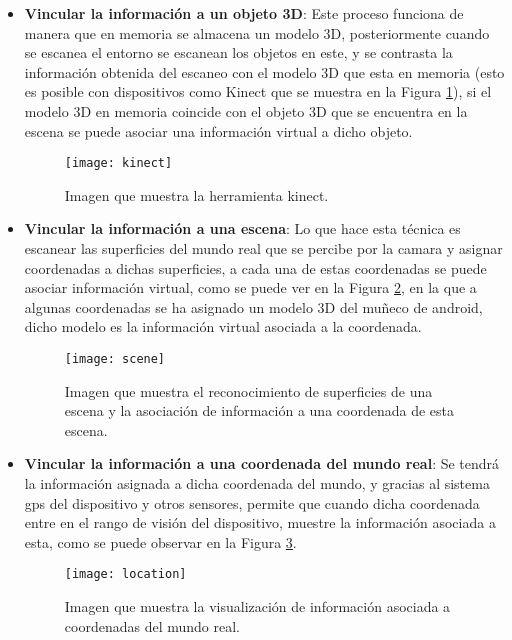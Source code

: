 \begin{itemize}
  \item \textbf{Vincular la información a un objeto 3D}: Este proceso funciona de manera que en memoria se almacena un modelo 3D, posteriormente cuando se escanea el entorno se escanean los objetos en este, y se contrasta la información obtenida del escaneo con el modelo 3D que esta en memoria (esto es posible con dispositivos como Kinect que se muestra en la Figura \ref{figura-kinect}), si el modelo 3D en memoria coincide con el objeto 3D que se encuentra en la escena se puede asociar una información virtual a dicho objeto.

  \begin{figure}[h]
    \centering
    \texttt{[image: kinect]}
    \caption{Imagen que muestra la herramienta kinect.\protect\footnotemark}
    \label{figura-kinect}
  \end{figure}


  \item \textbf{Vincular la información a una escena}:  Lo que hace esta técnica es escanear las superficies del mundo real que se percibe por la camara y asignar coordenadas a dichas superficies, a cada una de estas coordenadas se puede asociar información virtual, como se puede ver en la Figura \ref{figura-scene}, en la que a algunas coordenadas se ha asignado un modelo 3D del muñeco de android, dicho modelo es la información virtual asociada a la coordenada.

  \begin{figure}[h]
    \centering
    \texttt{[image: scene]}
    \caption{Imagen que muestra el reconocimiento de superficies de una escena y la asociación de información a una coordenada de esta escena.\protect\footnotemark}
    \label{figura-scene}
  \end{figure}


  \item \textbf{Vincular la información a una coordenada del mundo real}: Se tendrá la información asignada a dicha coordenada del mundo, y gracias al sistema gps del dispositivo y otros sensores, permite que cuando dicha coordenada entre en el rango de visión del dispositivo, muestre la información asociada a esta, como se puede observar en la Figura \ref{figura-location}.

  \begin{figure}[h]
    \centering
    \texttt{[image: location]}
    \caption{Imagen que muestra la visualización de información asociada a coordenadas del mundo real.\protect\footnotemark}
    \label{figura-location}
  \end{figure}


\end{itemize}

